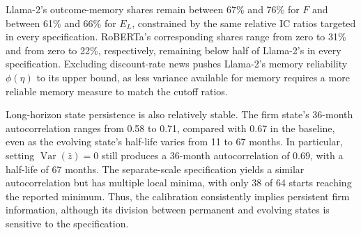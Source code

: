 \documentclass[11pt,letterpaper]{article}
\theoremstyle{remark}
\DeclareMathOperator{\Var}{Var}
\begin{document}
Llama-2's outcome-memory shares remain between 67\% and 76\% for $F$ and between 61\% and 66\% for $E_L$, constrained by the same relative IC ratios targeted in every specification. RoBERTa's corresponding shares range from zero to 31\% and from zero to 22\%, respectively, remaining below half of Llama-2's in every specification. Excluding discount-rate news pushes Llama-2's memory reliability $\phi(\eta)$ to its upper bound, as less variance available for memory requires a more reliable memory measure to match the cutoff ratios.

Long-horizon state persistence is also relatively stable. The firm state's 36-month autocorrelation ranges from 0.58 to 0.71, compared with 0.67 in the baseline, even as the evolving state's half-life varies from 11 to 67 months. In particular, setting $\Var(\bar z)=0$ still produces a 36-month autocorrelation of 0.69, with a half-life of 67 months. The separate-scale specification yields a similar autocorrelation but has multiple local minima, with only 38 of 64 starts reaching the reported minimum. Thus, the calibration consistently implies persistent firm information, although its division between permanent and evolving states is sensitive to the specification.
\end{document}
